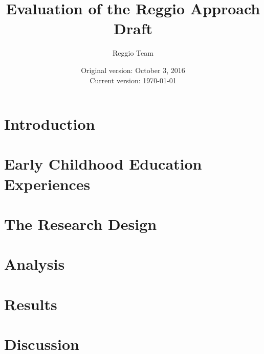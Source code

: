 






\title{\Large \textbf{Evaluation of the Reggio Approach} \\ Draft}
\author{\normalsize Reggio Team}
\date{\normalsize Original version: October 3, 2016 \\ Current version: \today}
\maketitle

\doublespacing

\section{Introduction}
\label{sec:introduction}


\section{Early Childhood Education Experiences}
\label{sec:eceexperiences}


\section{The Research Design}
\label{sec:data}



\section{Analysis}
\label{sec:methodology}
%


\section{Results}
\label{sec:result}


\section{Discussion}
\label{sec:discussion}


\clearpage






